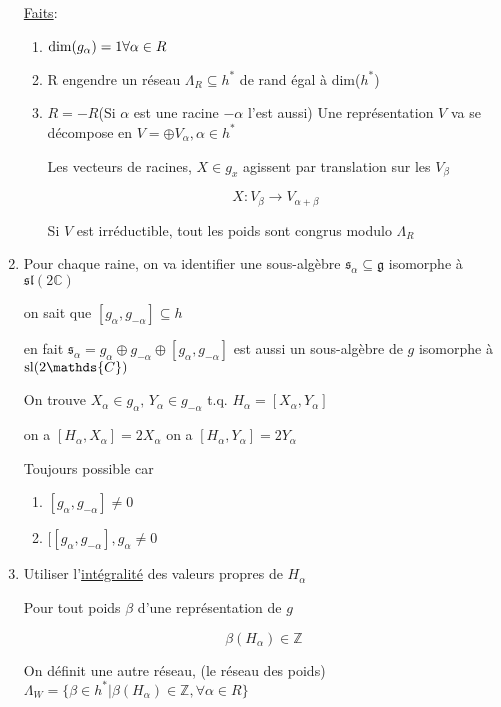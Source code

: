 \begin{enumerate}[label=\textbf{Étape \arabic*:}]
\underline{Faits}: 

\begin{enumerate}[label=\roman*)]
	\item \({\rm{}dim}(g_\alpha) =1 \forall \alpha \in R\)
	\item R engendre un réseau \(\Lambda_R \subseteq h^{*} \) de rand égal à dim(\(h^{*}\))
	\item \(R=-R\)(Si \(\alpha\) est une racine \(-\alpha\) l'est aussi)
		Une représentation \(V\) va se décompose en \(V= \oplus V_\alpha, \alpha \in h^{*}\)

Les vecteurs de racines, \(X \in g_x \) agissent par translation sur les \(V_{\beta} \)


\[ X: V_{\beta} \to V_{\alpha+\beta } \]


Si \(V\) est irréductible, tout les poids sont congrus modulo \(\Lambda_R\)
\end{enumerate}

\item Pour chaque raine, on va identifier une sous-algèbre \(\mathfrak{s}_\alpha \subseteq \mathfrak{g}\) isomorphe à \(\mathfrak{sl}(2 \mathds{C})\)

on sait que \([g_{\alpha}, g_{-\alpha} ] \subseteq h \)

en fait \( \mathfrak{s}_\alpha = g_{\alpha} \oplus g_{-\alpha} \oplus [g_{\alpha}, g_{-\alpha} ] \) est aussi un sous-algèbre de \(g\) isomorphe à \({\rm{}sl}(2 \mathds{C})\)

On trouve \( X_{\alpha} \in g_{\alpha} , \, Y_{\alpha}  \in g_{-\alpha} \) t.q. \(H_{\alpha} = [X_{\alpha}, Y_{\alpha}] \)

on a \([H_{\alpha}, X_{\alpha} ] = 2 X_{\alpha} \)
on a \([H_{\alpha}, Y_{\alpha} ] = 2 Y_\alpha\)


Toujours possible car 

\begin{enumerate}[label=\roman*)]
	\item \([g_{\alpha}, g_{-\alpha} ] \neq 0\)
	\item \([[g_{\alpha}, g_{-\alpha} ], g_{\alpha} \neq 0\)
\end{enumerate}

\item Utiliser l'\underline{intégralité} des valeurs propres de \(H_{\alpha} \) 

Pour tout poids \(\beta\) d'une représentation de \(g\)

\[ \beta(H_\alpha) \in \mathds{Z} \]

On définit une autre réseau, (le réseau des poids) \( \Lambda_W = \{ \beta \in h^{*} | \beta(H_{\alpha} ) \in \mathds{Z}, \forall \alpha \in R \} \)



\end{enumerate}
